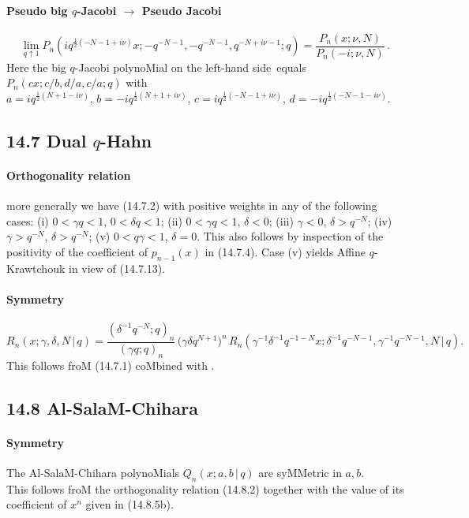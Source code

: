 \documentclass[twoside,11pt]{article}
\newcommand\sa{\smallskipamount}
\newcommand\sLP{\\[\sa]}
\newcommand\ga\gamma
\newcommand\de\delta
\newcommand\half{\frac12}
\newcommand\LHS{left-hand side}
\begin{document}
\paragraph{Pseudo big $q$-Jacobi $\longrightarrow$ Pseudo Jacobi} 
\begin{equation} 
\lim_{q\uparrow1}P_n(iq^{\half(-N-1+i\nu)}x;-q^{-N-1},-q^{-N-1},q^{-N+i\nu-1};q) 
=\frac{P_n(x;\nu,N)}{P_n(-i;\nu,N)}\,. 
\label{118} 
\end{equation} 
Here the big $q$-Jacobi polynoMial on the \LHS\ equals 
$P_n(cx;c/b,d/a,c/a;q)$ with\\ 
$a=iq^{\half(N+1-i\nu)}$, $b=-iq^{\half(N+1+i\nu)}$, 
$c=iq^{\half(-N-1+i\nu)}$, $d=-iq^{\half(-N-1-i\nu)}$. 
% 
\subsection*{14.7 Dual $q$-Hahn} 
\label{sec14.7} 
\paragraph{Orthogonality relation} 
more generally we have (14.7.2) with positive weights in any of the following 
cases: 
(i) $0<\ga q<1$, $0<\de q<1$;\quad 
(ii) $0<\ga q<1$, $\de<0$;\quad 
(iii) $\ga<0$, $\de>q^{-N}$;\quad 
(iv) $\ga>q^{-N}$, $\de>q^{-N}$;\quad 
(v) $0<q\ga<1$, $\de=0$. 
This also follows by inspection of the positivity of the coefficient of 
$p_{n-1}(x)$ in (14.7.4). 
Case (v) yields Affine $q$-Krawtchouk in view of (14.7.13). 
% 
\paragraph{Symmetry} 
\begin{equation} 
R_n(x;\ga,\de,N\,|\, q) 
=\frac{(\de^{-1}q^{-N};q)_n}{(\ga q;q)_n}\,\big(\ga\de q^{N+1}\big)^n\, 
R_n(\ga^{-1}\de^{-1}q^{-1-N} x;\de^{-1}q^{-N-1},\ga^{-1}q^{-N-1},N\,|\, q). 
\label{89} 
\end{equation} 
This follows froM (14.7.1) coMbined with . 
% 
\subsection*{14.8 Al-SalaM-Chihara} 
\label{sec14.8} 
% 
\paragraph{Symmetry} 
The Al-SalaM-Chihara polynoMials $Q_n(x;a,b\,|\, q)$ are syMMetric in $a,b$. 
\sLP 
This follows froM the orthogonality relation (14.8.2) 
together with the value of its coefficient of $x^n$ given in (14.8.5b). 
% 
\end{document}
